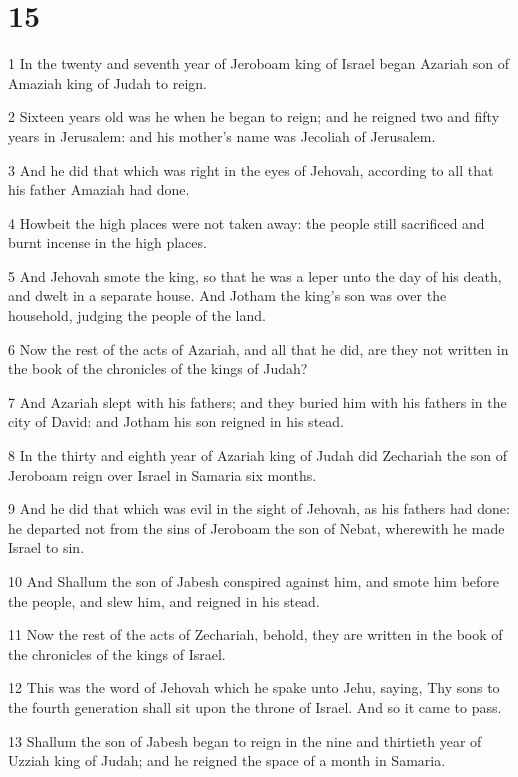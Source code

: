 \chapter{15}

\par 1 In the twenty and seventh year of Jeroboam king of Israel began Azariah son of Amaziah king of Judah to reign.
\par 2 Sixteen years old was he when he began to reign; and he reigned two and fifty years in Jerusalem: and his mother's name was Jecoliah of Jerusalem.
\par 3 And he did that which was right in the eyes of Jehovah, according to all that his father Amaziah had done.
\par 4 Howbeit the high places were not taken away: the people still sacrificed and burnt incense in the high places.
\par 5 And Jehovah smote the king, so that he was a leper unto the day of his death, and dwelt in a separate house. And Jotham the king's son was over the household, judging the people of the land.
\par 6 Now the rest of the acts of Azariah, and all that he did, are they not written in the book of the chronicles of the kings of Judah?
\par 7 And Azariah slept with his fathers; and they buried him with his fathers in the city of David: and Jotham his son reigned in his stead.
\par 8 In the thirty and eighth year of Azariah king of Judah did Zechariah the son of Jeroboam reign over Israel in Samaria six months.
\par 9 And he did that which was evil in the sight of Jehovah, as his fathers had done: he departed not from the sins of Jeroboam the son of Nebat, wherewith he made Israel to sin.
\par 10 And Shallum the son of Jabesh conspired against him, and smote him before the people, and slew him, and reigned in his stead.
\par 11 Now the rest of the acts of Zechariah, behold, they are written in the book of the chronicles of the kings of Israel.
\par 12 This was the word of Jehovah which he spake unto Jehu, saying, Thy sons to the fourth generation shall sit upon the throne of Israel. And so it came to pass.
\par 13 Shallum the son of Jabesh began to reign in the nine and thirtieth year of Uzziah king of Judah; and he reigned the space of a month in Samaria.
